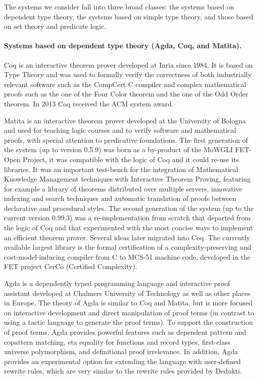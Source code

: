 The systems we consider fall into three broad classes: the systems
based on dependent type theory, the systems based on simple type
theory, and those based on set theory and predicate logic.

\paragraph*{Systems based on dependent type theory (Agda, Coq, and Matita).}

Coq is an interactive theorem prover developed at Inria since 1984.
It is based on Type Theory and was used to formally verify the
correctness of both industrially relevant software such as the
CompCert C compiler and complex mathematical proofs such as the one of
the Four Color theorem and the one of the Odd Order theorem. In 2013
Coq received the ACM system award.

Matita is an interactive theorem prover developed at the University of
Bologna and used for teaching logic courses and to verify software and
mathematical proofs, with special attention to predicative
foundations. The first generation of the system (up to version 0.5.9)
was born as a by-product of the MoWGLI FET-Open Project, it was
compatible with the logic of Coq and it could re-use its libraries. It
was an important test-bench for the integration of Mathematical
Knowledge Management techniques with Interactive Theorem Proving,
featuring for example a library of theorems distributed over multiple
servers, innovative indexing and search techniques and automatic
translation of proofs between declarative and procedural styles. The
second generation of the system (up to the current version 0.99.3) was
a re-implementation from scratch that departed from the logic of Coq
and that experimented with the most concise ways to implement an
efficient theorem prover. Several ideas later migrated into Coq. The
currently available largest library is the formal certification of a
complexity-preserving and cost-model-inducing compiler from C to
MCS-51 machine code, developed in the FET project CerCo (Certified
Complexity).

Agda is a dependently typed programming language and interactive proof
assistant developed at Chalmers University of Technology as well as
other places in Europe. The theory of Agda is similar to Coq and
Matita, but is more focused on interactive development and direct
manipulation of proof terms (in contrast to using a tactic language to
generate the proof terms). To support the construction of proof terms,
Agda provides powerful features such as dependent pattern and
copattern matching, eta equality for functions and record types,
first-class universe polymorphism, and definitional proof
irrelevance. In addition, Agda provides an experimental option for
extending the language with user-defined rewrite rules, which are very
similar to the rewrite rules provided by Dedukti.

